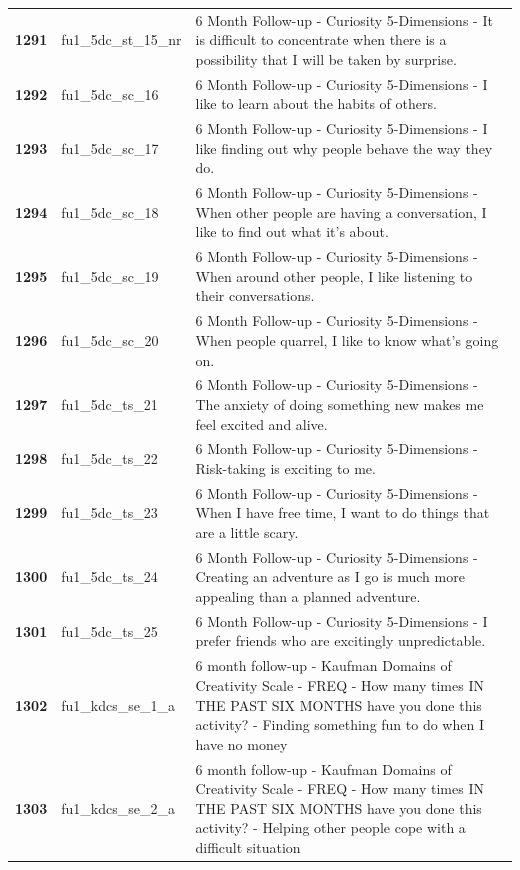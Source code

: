 \documentclass[
  letterpaper,
  DIV=11,
  numbers=noendperiod]{scrartcl}
\begin{document}
\begin{longtable}[t]{>{}cll}
\addlinespace
\textbf{1291} & fu1\_5dc\_st\_15\_nr & 6 Month Follow-up - Curiosity 5-Dimensions - It is difficult to concentrate when there is a possibility that I will be taken by surprise.\\
\textbf{1292} & fu1\_5dc\_sc\_16 & 6 Month Follow-up - Curiosity 5-Dimensions - I like to learn about the habits of others.\\
\textbf{1293} & fu1\_5dc\_sc\_17 & 6 Month Follow-up - Curiosity 5-Dimensions - I like finding out why people behave the way they do.\\
\textbf{1294} & fu1\_5dc\_sc\_18 & 6 Month Follow-up - Curiosity 5-Dimensions - When other people are having a conversation, I like to find out what it's about.\\
\textbf{1295} & fu1\_5dc\_sc\_19 & 6 Month Follow-up - Curiosity 5-Dimensions - When around other people, I like listening to their conversations.\\
\addlinespace
\textbf{1296} & fu1\_5dc\_sc\_20 & 6 Month Follow-up - Curiosity 5-Dimensions - When people quarrel, I like to know what's going on.\\
\textbf{1297} & fu1\_5dc\_ts\_21 & 6 Month Follow-up - Curiosity 5-Dimensions - The anxiety of doing something new makes me feel excited and alive.\\
\textbf{1298} & fu1\_5dc\_ts\_22 & 6 Month Follow-up - Curiosity 5-Dimensions - Risk-taking is exciting to me.\\
\textbf{1299} & fu1\_5dc\_ts\_23 & 6 Month Follow-up - Curiosity 5-Dimensions - When I have free time, I want to do things that are a little scary.\\
\textbf{1300} & fu1\_5dc\_ts\_24 & 6 Month Follow-up - Curiosity 5-Dimensions - Creating an adventure as I go is much more appealing than a planned adventure.\\
\addlinespace
\textbf{1301} & fu1\_5dc\_ts\_25 & 6 Month Follow-up - Curiosity 5-Dimensions - I prefer friends who are excitingly unpredictable.\\
\textbf{1302} & fu1\_kdcs\_se\_1\_a & 6 month follow-up - Kaufman Domains of Creativity Scale - FREQ - How many times IN THE PAST SIX MONTHS have you done this activity? - Finding something fun to do when I have no money\\
\textbf{1303} & fu1\_kdcs\_se\_2\_a & 6 month follow-up - Kaufman Domains of Creativity Scale - FREQ - How many times IN THE PAST SIX MONTHS have you done this activity? - Helping other people cope with a difficult situation\\

\end{longtable}
\end{document}
